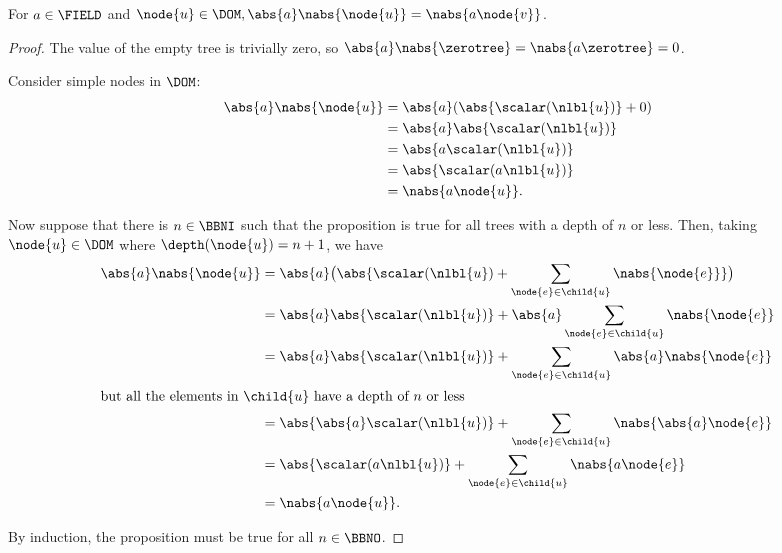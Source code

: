 \begin{proposition}\label{absolutehomogeneity}
  For $a \in \FIELD$ and $\node{u} \in \DOM, \abs{a}\nabs{\node{u}} =
  \nabs{a \node{v}}$.
  \begin{proof}
    The value of the empty tree is trivially zero, so $\abs{a}\nabs{\zerotree} =
    \nabs{a\zerotree} = 0$.

    Consider simple nodes in $\DOM$:
    \begin{align*}
      \abs{a}\nabs{\node{u}} &= \abs{a}(\abs{\scalar(\nlbl{u})} + 0) \\
      &= \abs{a}\abs{\scalar(\nlbl{u})} \\
      &= \abs{a\scalar(\nlbl{u})} \\
      &= \abs{\scalar(a\nlbl{u})} \\
      &= \nabs{a \node{u}}.
    \end{align*}

    Now suppose that there is $n \in \BBNI$ such that the proposition is true for
    all trees with a depth of $n$ or less. Then, taking $\node{u} \in
    \DOM$ where $\depth(\node{u}) = n+1$, we have
    \begin{align*}
      \abs{a}\nabs{\node{u}} &= \abs{a}\bigl(\abs{\scalar(\nlbl{u}) + \sum_{\node{e}\in\child{u}}\nabs{\node{e}}}\bigr) \\
      &= \abs{a}\abs{\scalar(\nlbl{u})} + \abs{a}\sum_{\node{e}\in\child{u}}\nabs{\node{e}}\\
      &= \abs{a}\abs{\scalar(\nlbl{u})} + \sum_{\node{e}\in\child{u}}\abs{a}\nabs{\node{e}}\\
      \intertext{but all the elements in $\child{u}$ have a depth of $n$ or less}
      &= \abs{\abs{a}\scalar(\nlbl{u})} + \sum_{\node{e}\in\child{u}}\nabs{\abs{a}\node{e}} \\
      &= \abs{\scalar(a\nlbl{u})} + \sum_{\node{e}\in\child{u}}\nabs{a \node{e}} \\
      &= \nabs{a \node{u}}.
    \end{align*}

    By induction, the proposition must be true for all $n \in \BBNO$.
  \end{proof}
\end{proposition}

